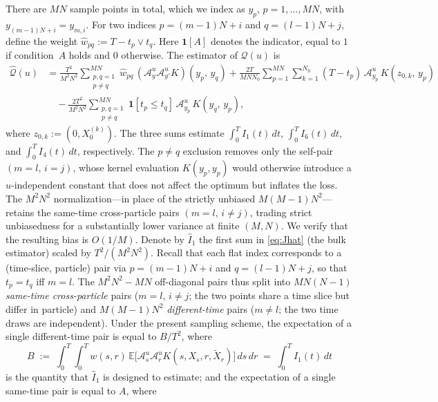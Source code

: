\documentclass[11pt,leqno]{article}
\theoremstyle{plain}
\theoremstyle{remark}
\theoremstyle{definition}
\numberwithin{equation}{section}
\numberwithin{figure}{section}
\numberwithin{table}{section}
\begin{document}
There are $MN$ sample points in total, which we index as $y_p$,
$p=1,\ldots,MN$, with $y_{(m-1)N+i}=y_{m,i}$.
For two indices $p=(m-1)N+i$ and $q=(l-1)N+j$, define the weight
$\hat{w}_{pq}:=T - t_p\vee t_q$.
Here $\mathbf{1}[A]$ denotes the indicator, equal to $1$ if condition~$A$ holds and $0$ otherwise.
The estimator of $\mathcal{Q}(u)$ is
\begin{equation}\label{eq:Jhat}
\begin{aligned}
 \hat{\mathcal{Q}}(u)
 &= \frac{T^2}{M^2 N^2}\sum_{\substack{p,q=1\\p\neq q}}^{MN}
   \hat{w}_{pq}\,(\mathcal{A}^u_y\mathcal{A}^u_{y'}K)(y_p,\,y_q) + \frac{2T}{MNN_0}\sum_{p=1}^{MN}\sum_{k=1}^{N_0}
   (T - t_p)\,
   \mathcal{A}^u_{y_p}\,K(z_{0,k},\,y_p) \\
 &\quad - \frac{2T^2}{M^2 N^2}\sum_{\substack{p,q=1\\p\neq q}}^{MN}
   \mathbf{1}[t_p\le t_q]\,
   \mathcal{A}^u_{y_p}\,K(y_q,\,y_p),
\end{aligned}
\end{equation}
where $z_{0,k}:=(0,X_0^{(k)})$.
The three sums estimate $\int_0^T I_1(t)\,dt$, $\int_0^T I_6(t)\,dt$, and $\int_0^T I_4(t)\,dt$, respectively.
The $p\neq q$ exclusion removes only the self-pair $(m{=}l,\,i{=}j)$,
whose kernel evaluation $K(y_p,y_p)$ would otherwise introduce a
$u$-independent constant that does not affect the optimum but inflates
the loss.  The $M^2N^2$ normalization---in place of the strictly
unbiased $M(M{-}1)N^2$---retains the same-time cross-particle pairs
$(m{=}l,\,i{\neq}j)$, trading strict unbiasedness for a substantially
lower variance at finite $(M,N)$.  We verify that the resulting bias
is $O(1/M)$.  Denote by $\hat I_1$ the first sum in \eqref{eq:Jhat}
(the bulk estimator) scaled by $T^2/(M^2N^2)$.  Recall that each
flat index corresponds to a (time-slice, particle) pair via
$p=(m{-}1)N+i$ and $q=(l{-}1)N+j$, so that $t_p=t_q$ iff $m=l$.
The $M^2N^2{-}MN$ off-diagonal pairs thus split into $MN(N{-}1)$
\emph{same-time cross-particle} pairs ($m=l$, $i\ne j$; the two points
share a time slice but differ in particle) and $M(M{-}1)N^2$
\emph{different-time} pairs ($m\ne l$; the two time draws are
independent).  
Under the present sampling scheme, the expectation of a single different-time
pair is equal to $B/T^2$, where
\[
 B\;:=\;\int_0^T\!\!\int_0^T\! w(s,r)\,
 \mathbb{E}\bigl[\mathcal{A}^u_s\mathcal{A}^u_r K(s,X_s,r,\tilde X_r)\bigr]\,ds\,dr
 \;=\;\int_0^T\! I_1(t)\,dt
\]
is the quantity that $\hat I_1$ is designed to estimate; and the
expectation of a single same-time pair is equal to $A$, where
\end{document}
